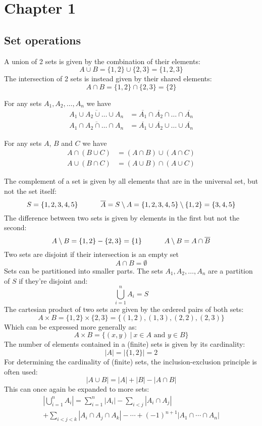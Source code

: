 \section{Chapter 1}
\subsection{Set operations}
A union of 2 sets is given by the combination of their elements:
\[
    A\cup B = \{1,2\}\cup\{2,3\}=\{1,2,3\}
\]
The intersection of 2 sets is instead given by their shared elements:
\[
    A\cap B=\{1,2\}\cap\{2,3\}=\{2\}
\]
\begin{theorem}
  For any sets $A_1,A_2,\ldots,A_n$ we have
  \begin{align*}
    \overline{A_1\cup A_2\cup \ldots \cup A_n}&=\overline{A_1}\cap\overline{A_2}\cap\ldots\cap\overline{A_n} \\
    \overline{A_1\cap A_2\cap\ldots\cap A_n}&=\overline{A_1}\cup\overline{A_2}\cup\ldots\cup\overline{A_n}
  \end{align*}
\end{theorem}

\begin{theorem}
  For any sets $A$, $B$ and $C$ we have
  \begin{align*}
      A\cap(B\cup C)&=(A\cap B)\cup (A\cap C) \\
      A\cup(B\cap C)&=(A\cup B)\cap (A\cup C)
  \end{align*}
\end{theorem}
The complement of a set is given by all elements that are in the universal set, but not the set itself:
\[
    S=\{1,2,3,4,5\}\hskip 32pt \overline{A}=S\setminus A=\{1,2,3,4,5\}\setminus\{1,2\}=\{3,4,5\}
\]
The difference between two sets is given by elements in the first but not the second:
\[
    A\setminus B=\{1,2\}-\{2,3\}=\{1\}\hskip 32pt A\setminus B=A\cap\overline{B}
\]
Two sets are disjoint if their intersection is an empty set
\[
    A\cap B=\emptyset
\]
Sets can be partitioned into smaller parts. The sets $A_1,A_2,\ldots,A_n$ are a partition of $S$ if they're disjoint and:
\[
    \bigcup_{i=1}^n A_i=S
\]
The cartesian product of two sets are given by the ordered pairs of both sets:
\[
    A\times B=\{1,2\}\times\{2,3\}=\{(1,2),(1,3),(2,2),(2,3)\}
\]
Which can be expressed more generally as:
\[
    A\times B=\{(x,y)~|~x\in A \text{ and } y\in B\}
\]
The number of elements contained in a (finite) sets is given by its cardinality:
\[
    |A|=|\{1,2\}|=2
\]
For determining the cardinality of (finite) sets, the inclusion-exclusion principle is often used:
\[
    |A\cup B|=|A|+|B|-|A\cap B|
\]
This can once again be expanded to more sets:
\begin{equation*}
    \begin{gathered}
    |\bigcup_{i=1}^n A_i|=\sum_{i=1}^n |A_i|-\sum_{i<j}|A_i\cap A_j| \\
    +\sum_{i<j<k}|A_i\cap A_j\cap A_k|-\cdots +(-1)^{n+1}|A_1\cap \cdots\cap A_n|
    \end{gathered}
\end{equation*}
